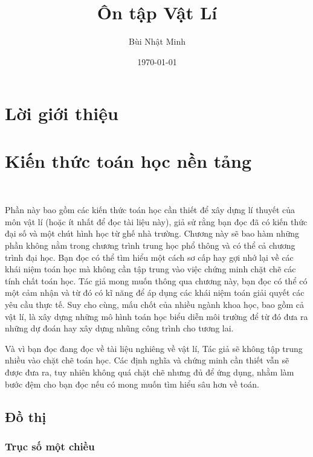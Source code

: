 \documentclass[a4paper, titlepage, openany]{book}
\title{\Huge Ôn tập Vật Lí}
\author{Bùi Nhật Minh}
\date{\today}
\begin{document}
\maketitle

\setcounter{chapter}{-1}
\renewcommand{\thefigure}{\thechapter.\arabic{figure}}
\renewcommand{\thetable}{\thechapter.\arabic{table}}
\tableofcontents

\chapter*{Lời giới thiệu}


\chapter{Kiến thức toán học nền tảng}

\ %

Phần này bao gồm các kiến thức toán học cần thiết để xây dựng lí thuyết của môn vật lí (hoặc ít nhất để đọc tài liệu này), giả sử rằng bạn đọc đã có kiến thức đại số và một chút hình học từ ghế nhà trường. Chương này sẽ bao hàm những phần không nằm trong chương trình trung học phổ thông và có thể cả chương trình đại học. Bạn đọc có thể tìm hiểu một cách sơ cấp hay gợi nhớ lại về các khái niệm toán học mà không cần tập trung vào việc chứng minh chặt chẽ các tính chất toán học. Tác giả mong muốn thông qua chương này, bạn đọc có thể có một cảm nhận và từ đó có kĩ năng để áp dụng các khái niệm toán giải quyết các yêu cầu thực tế. Suy cho cùng, mấu chốt của nhiều ngành khoa học, bao gồm cả vật lí, là xây dựng những mô hình toán học biểu diễn môi trường để từ đó đưa ra những dự đoán hay xây dựng nhũng công trình cho tương lai.

Và vì bạn đọc đang đọc về tài liệu nghiêng về vật lí, Tác giả sẽ không tập trung nhiều vào chặt chẽ toán học. Các định nghĩa và chứng minh cần thiết vẫn sẽ được đưa ra, tuy nhiên không quá chặt chẽ nhưng đủ để ứng dụng, nhằm làm bước đệm cho bạn đọc nếu có mong muốn tìm hiểu sâu hơn về toán.

\section{Đồ thị}

\subsection{Trục số một chiều}
\end{document}
